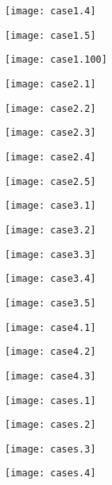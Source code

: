 \documentclass[12pt,a4paper,amstags,fleqn,reqno]{article}
\begin{document}
\begin{center} \texttt{[image: case1.4]} \end{center}
\begin{center} \texttt{[image: case1.5]} \end{center}
\begin{center} \texttt{[image: case1.100]} \end{center}
\begin{center} \texttt{[image: case2.1]} \end{center}
\begin{center} \texttt{[image: case2.2]} \end{center}
\begin{center} \texttt{[image: case2.3]} \end{center}
\begin{center} \texttt{[image: case2.4]} \end{center}
\begin{center} \texttt{[image: case2.5]} \end{center}
\begin{center} \texttt{[image: case3.1]} \end{center}
\begin{center} \texttt{[image: case3.2]} \end{center}
\begin{center} \texttt{[image: case3.3]} \end{center}
\begin{center} \texttt{[image: case3.4]} \end{center}
\begin{center} \texttt{[image: case3.5]} \end{center}
\begin{center} \texttt{[image: case4.1]} \end{center}
\begin{center} \texttt{[image: case4.2]} \end{center}
\begin{center} \texttt{[image: case4.3]} \end{center}
\begin{center} \texttt{[image: cases.1]} \end{center}
\begin{center} \texttt{[image: cases.2]} \end{center}
\begin{center} \texttt{[image: cases.3]} \end{center}
\begin{center} \texttt{[image: cases.4]} \end{center}
\end{document}
